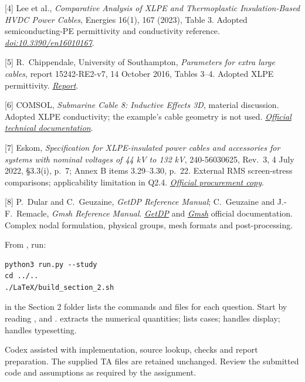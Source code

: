 \documentclass[11pt,a4paper]{article}
\newcommand{\subhead}[1]{\par\medskip{\large\bfseries #1}\par\smallskip}
\newcommand{\source}[2]{\href{#1}{\textit{#2}}}
\begin{document}
[4] Lee et al., \textit{Comparative Analysis of XLPE and Thermoplastic
Insulation-Based HVDC Power Cables}, Energies 16(1), 167 (2023), Table 3.
Adopted semiconducting-PE permittivity and conductivity reference.
\source{https://doi.org/10.3390/en16010167}{doi:10.3390/en16010167}.

[5] R.~Chippendale, University of Southampton, \textit{Parameters for extra large
cables}, report 15242-RE2-v7, 14 October 2016, Tables 3--4.
Adopted XLPE permittivity.
\source{https://www.transmissionexcel.com/wp-content/uploads/2016/11/Parameters-for-extra-large-cables-FINAL.pdf}{Report}.

[6] COMSOL, \textit{Submarine Cable 8: Inductive Effects 3D}, material discussion.
Adopted XLPE conductivity; the example's cable geometry is not used.
\source{https://doc.comsol.com/6.4/doc/com.comsol.help.models.acdc.submarine_cable_08_inductive_effects_3d/submarine_cable_08_inductive_effects_3d.html}{Official technical documentation}.

[7] Eskom, \textit{Specification for XLPE-insulated power cables and accessories
for systems with nominal voltages of 44 kV to 132 kV}, 240-56030625, Rev.~3,
4 July 2022, \S3.3(i), p.~7; Annex B items 3.29--3.30, p.~22.
External RMS screen-stress comparisons; applicability limitation in Q2.4.
\source{https://www.etenders.gov.za/home/Download/?blobName=b55b97a6-fb2e-492f-8eb0-01bc9574c555.pdf\&downloadedFileName=240-56030625_Specificatin+for+HV+XLPE+cables+and+accessories.pdf}{Official procurement copy}.

[8] P.~Dular and C.~Geuzaine, \textit{GetDP Reference Manual}; C.~Geuzaine and
J.-F.~Remacle, \textit{Gmsh Reference Manual}.
\source{https://getdp.info/doc/texinfo/getdp.html}{GetDP} and
\source{https://gmsh.info/doc/texinfo/gmsh.html}{Gmsh} official documentation.
Complex nodal formulation, physical groups, mesh formats and post-processing.
\endgroup
\subhead{Full study and PDF build}
From , run:
\begin{lstlisting}[style=command]
python3 run.py --study
cd ../..
./LaTeX/build_section_2.sh
\end{lstlisting}
 in the Section 2 folder lists the commands and files for each
question. Start by reading ,  and .
 extracts the numerical quantities;  lists cases;
 handles display;  handles typesetting.

Codex assisted with implementation, source lookup, checks and report preparation.
The supplied TA files are retained unchanged. Review the submitted code and
assumptions as required by the assignment.
\end{document}
